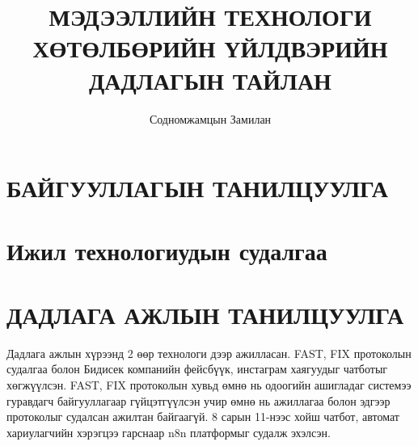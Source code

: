 \documentclass[12pt,A4]{report}
\begin{document}

\title{МЭДЭЭЛЛИЙН ТЕХНОЛОГИ ХӨТӨЛБӨРИЙН ҮЙЛДВЭРИЙН ДАДЛАГЫН ТАЙЛАН}
\author{Содномжамцын Замилан}






\chapter{БАЙГУУЛЛАГЫН ТАНИЛЦУУЛГА}


\chapter{Ижил технологиудын судалгаа}


\chapter{ДАДЛАГА АЖЛЫН ТАНИЛЦУУЛГА}
    Дадлага ажлын хүрээнд 2 өөр технологи дээр ажилласан. FAST, FIX протоколын судалгаа болон Бидисек компанийн фейсбүүк, инстаграм хаягуудыг чатботыг хөгжүүлсэн. FAST, FIX протоколын хувьд өмнө нь одоогийн ашигладаг системээ гуравдагч байгууллагаар гүйцэтгүүлсэн учир өмнө нь ажиллагаа болон эдгээр протоколыг судалсан ажилтан байгаагүй. 8 сарын 11-нээс хойш чатбот, автомат хариулагчийн хэрэгцээ гарснаар n8n платформыг судалж эхэлсэн.
\end{document}
